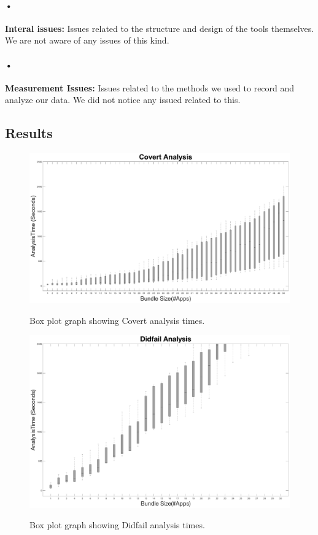 \documentclass[twocolumn]{article}
\begin{document}
\paragraph{•}
	\textbf{Interal issues:} Issues related to the structure and design of the tools themselves. We are not aware of any issues of this kind.
\paragraph{•}
	\textbf{Measurement Issues:} Issues related to the methods we used to record and analyze our data. We did not notice any issued related to this.
	

\subsection{Results}
\onecolumn
\begin{figure}[hb!]
	\includegraphics[width=\textwidth]{CovertBoxPlot}
	\label{figure:1}
	\caption{Box plot graph showing Covert analysis times.}
\end{figure}
\begin{figure}[hb!]
	\includegraphics[width=\textwidth]{DidfailBoxPlot}
	\label{figure:2}
	\caption{Box plot graph showing Didfail analysis times.}
\end{figure}
\end{document}
